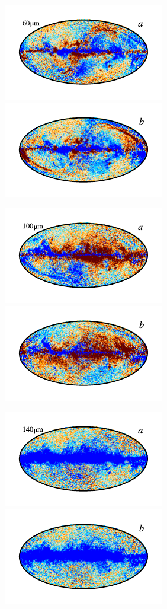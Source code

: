 \documentclass{aa}
\begin{document}
\begin{figure}
	\includegraphics{figs/res_maps/res_07a_c0001_000019.pdf}\includegraphics{figs/res_maps/res_07b_c0001_000019.pdf}
  \vspace*{-0.85cm}

	\includegraphics{figs/res_maps/res_08a_c0001_000019.pdf}\includegraphics{figs/res_maps/res_08b_c0001_000019.pdf}
  \vspace*{-0.85cm}

	\includegraphics{figs/res_maps/res_09a_c0001_000019.pdf}\includegraphics{figs/res_maps/res_09b_c0001_000019.pdf}
  \vspace*{-0.85cm}


\end{figure}
\end{document}
